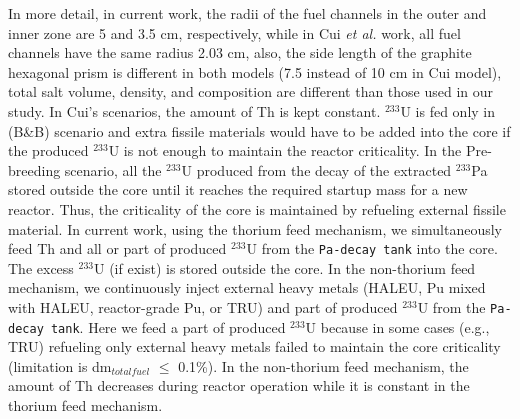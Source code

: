 \documentclass[answers,11pt]{exam}
\begin{document}
\begin{questions}
\begin{solution}
                In more detail, in current work, the radii of the fuel channels in the outer and inner zone are 5 and 3.5 cm, respectively, while in Cui \emph{et al.} work, all fuel channels have the same radius 2.03 cm, also, the side length of the graphite hexagonal prism is different in both models (7.5 instead of 10 cm in Cui model), total salt volume, density, and composition are different than those used in our study. In Cui's scenarios, the amount of Th is kept constant. $^{233}$U is fed only in (B\&B) scenario and extra fissile materials would have to be added into the core if the produced $^{233}$U is not enough to maintain the reactor criticality. In the Pre-breeding scenario, all the $^{233}$U produced from the decay of the extracted $^{233}$Pa stored outside the core until it reaches the required startup mass for a new reactor. Thus, the criticality of the core is maintained by refueling external fissile material. 
                In current work, using the thorium feed mechanism, we simultaneously feed Th and all or part of produced $^{233}$U from the \texttt{Pa-decay tank} into the core. The excess $^{233}$U (if exist) is stored outside the core. In the non-thorium feed mechanism, we continuously inject external heavy metals (HALEU, Pu mixed with HALEU, reactor-grade Pu, or TRU) and part of produced $^{233}$U from the \texttt{Pa-decay tank}. Here we feed a part of produced $^{233}$U because in some cases (e.g., TRU) refueling only external heavy metals failed to maintain the core criticality (limitation is dm$_{total fuel}$ $\leq$ 0.1\%). In the non-thorium feed mechanism, the amount of Th decreases during reactor operation while it is constant in the thorium feed mechanism.
                
        \end{solution}

        


\end{questions}
\end{document}
